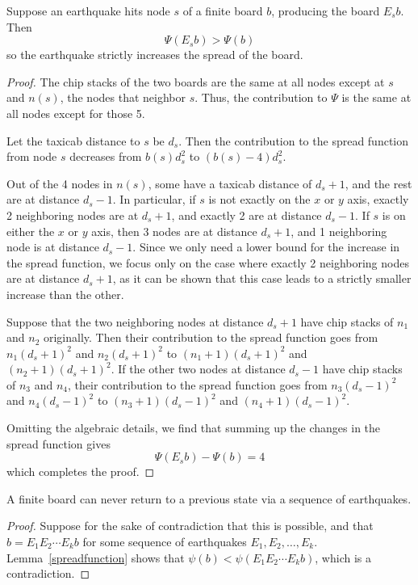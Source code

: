 \documentclass[runningheads,a4paper]{llncs}
\begin{document}
\begin{lemma}
\label{spreadfunction}
Suppose an earthquake hits node $s$ of a finite board $b$, producing the board $E_sb$. Then
\begin{equation*}
\Psi(E_sb) > \Psi(b) 
\end{equation*}
so the earthquake strictly increases the spread of the board.
\end{lemma}
\begin{proof}
The chip stacks of the two boards are the same at all nodes except at $s$ and $n(s)$, the nodes that neighbor $s$. Thus, the contribution to $\Psi$ is the same at all nodes except for those 5.

Let the taxicab distance to $s$ be $d_s$. Then the contribution to the spread function from node $s$ decreases from $b(s)d_s^2$ to $(b(s)-4)d_s^2$.

Out of the 4 nodes in $n(s)$, some have a taxicab distance of $d_s+1$, and the rest are at distance $d_s-1$. In particular, if $s$ is not exactly on the $x$ or $y$ axis, exactly 2 neighboring nodes are at $d_s+1$, and exactly 2 are at distance $d_s-1$. If $s$ is on either the $x$ or $y$ axis, then 3 nodes are at distance $d_s+1$, and 1 neighboring node is at distance $d_s-1$. Since we only need a lower bound for the increase in the spread function, we focus only on the case where exactly 2 neighboring nodes are at distance $d_s+1$, as it can be shown that this case leads to a strictly smaller increase than the other.

Suppose that the two neighboring nodes at distance $d_s+1$ have chip stacks of $n_1$ and $n_2$ originally. Then their contribution to the spread function goes from $n_1(d_s+1)^2$ and $n_2(d_s+1)^2$ to $(n_1+1)(d_s+1)^2$ and $(n_2+1)(d_s+1)^2$. If the other two nodes at distance $d_s-1$ have chip stacks of $n_3$ and $n_4$, their contribution to the spread function goes from $n_3(d_s-1)^2$ and $n_4(d_s-1)^2$ to $(n_3+1)(d_s-1)^2$ and $(n_4+1)(d_s-1)^2$.

Omitting the algebraic details, we find that summing up the changes in the spread function gives
\begin{equation*}
 \Psi(E_sb) - \Psi(b) = 4
 \end{equation*}
which completes the proof.
\end{proof}

\begin{corollary}
\label{norepeats}
A finite board can never return to a previous state via a sequence of earthquakes.
\end{corollary}
\begin{proof}
Suppose for the sake of contradiction that this is possible, and that $b = E_1E_2\cdots E_kb$ for some sequence of earthquakes $E_1,E_2,\dots,E_k$. Lemma~\ref{spreadfunction} shows that $\psi(b) < \psi(E_1E_2\cdots E_kb)$, which is a contradiction.
\end{proof} 
\end{document}

